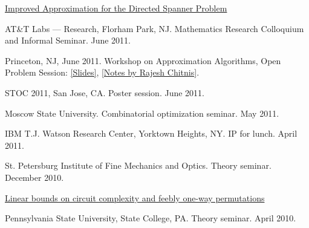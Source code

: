 \documentclass[11pt]{article}
\newenvironment{innerlist}[1][\enskip\textbullet]%
        {\begin{compactitem}[#1]}{\end{compactitem}}
\newcommand{\blankline}{\quad\pagebreak[2]}
\begin{document}
\begin{innerlist}
\item \href{http://grigory.us/files/talks/20110704_Directed_Spanners_ICALP11.pptx}{Improved Approximation for the Directed Spanner Problem}
\begin{innerlist}
  \item AT\&T Labs --- Research, Florham Park, NJ. Mathematics Research Colloquium and Informal Seminar. June 2011.
  \item Princeton, NJ, June 2011. Workshop on Approximation Algorithms, Open Problem Session: \href{http://grigory.us/files/directed-spanners-open-problems.pptx}{[Slides]}, \href{http://grigory.us/files/grigory.pdf}{[Notes by \href{http://www.cs.umd.edu/~rchitnis/}{Rajesh Chitnis}]}.
  \item STOC 2011, San Jose, CA. Poster session. June 2011.
  \item Moscow State University. Combinatorial optimization seminar. May 2011.
  \item IBM T.J. Watson Research Center, Yorktown Heights, NY. IP for lunch. April 2011.
  \item St. Petersburg Institute of Fine Mechanics and Optics. Theory seminar. December 2010.

\end{innerlist}
\item \href{http://grigory.us/files/talks/penn10.pdf}{Linear bounds on circuit complexity and feebly one-way permutations}
    \begin{innerlist}
      \item Pennsylvania State University, State College, PA. Theory seminar. April 2010.
    \end{innerlist}
\end{innerlist}
\blankline

%
\end{document}
